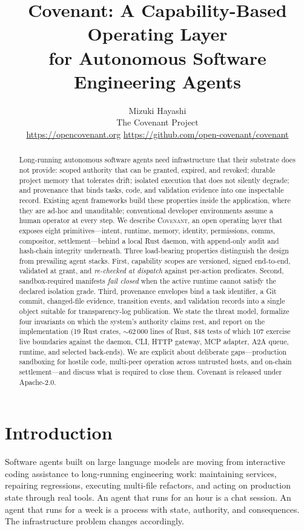 \documentclass[11pt]{article}
\title{\bfseries Covenant: A Capability-Based Operating Layer\\for Autonomous Software Engineering Agents}
\author{Mizuki Hayashi\\[2pt]
\small The Covenant Project\\
\small\url{https://opencovenant.org} \quad\textbar\quad \small\url{https://github.com/open-covenant/covenant}}
\date{}
\theoremstyle{plainsmall}
\begin{document}
\maketitle

\begin{abstract}
\noindent Long-running autonomous software agents need infrastructure that their substrate does not provide: scoped authority that can be granted, expired, and revoked; durable project memory that tolerates drift; isolated execution that does not silently degrade; and provenance that binds tasks, code, and validation evidence into one inspectable record. Existing agent frameworks build these properties inside the application, where they are ad-hoc and unauditable; conventional developer environments assume a human operator at every step. We describe \textsc{Covenant}, an open operating layer that exposes eight primitives---intent, runtime, memory, identity, permissions, comms, compositor, settlement---behind a local Rust daemon, with append-only audit and hash-chain integrity underneath. Three load-bearing properties distinguish the design from prevailing agent stacks. First, capability scopes are versioned, signed end-to-end, validated at grant, and \emph{re-checked at dispatch} against per-action predicates. Second, sandbox-required manifests \emph{fail closed} when the active runtime cannot satisfy the declared isolation grade. Third, provenance envelopes bind a task identifier, a Git commit, changed-file evidence, transition events, and validation records into a single object suitable for transparency-log publication. We state the threat model, formalize four invariants on which the system's authority claims rest, and report on the implementation (19 Rust crates, $\sim$62\,000 lines of Rust, 848 tests of which 107 exercise live boundaries against the daemon, CLI, HTTP gateway, MCP adapter, A2A queue, runtime, and selected back-ends). We are explicit about deliberate gaps---production sandboxing for hostile code, multi-peer operation across untrusted hosts, and on-chain settlement---and discuss what is required to close them. Covenant is released under Apache-2.0.
\end{abstract}

\section{Introduction}
\label{sec:intro}

Software agents built on large language models are moving from interactive coding assistance to long-running engineering work: maintaining services, repairing regressions, executing multi-file refactors, and acting on production state through real tools. An agent that runs for an hour is a chat session. An agent that runs for a week is a process with state, authority, and consequences. The infrastructure problem changes accordingly.
\end{document}
